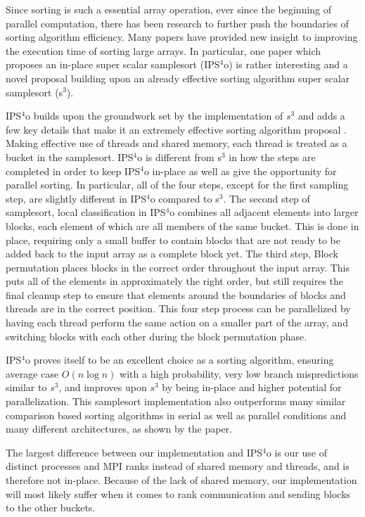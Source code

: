 \documentclass[10pt,letterpaper]{article}
\begin{document}
\begin{multicols}{2}
Since sorting is such a essential array operation, ever since the beginning of parallel computation, there has been research to further push the boundaries of sorting algorithm efficiency. Many papers have provided new insight to improving the execution time of sorting large arrays. In particular, one paper which proposes an in-place super scalar samplesort (IPS$^4$o) is rather interesting and a novel proposal building upon an already effective sorting algorithm super scalar samplesort (s$^3$).

IPS$^4$o builds upon the groundwork set by the implementation of $s^3$ \cite{10.1007/978-3-540-30140-0_69} and adds a few key details that make it an extremely effective sorting algorithm proposal \cite{DBLP:journals/corr/AxtmannWF017}. Making effective use of threads and shared memory, each thread is treated as a bucket in the samplesort. IPS$^4$o is different from s$^3$ in how the steps are completed in order to keep IPS$^4$o in-place as well as give the opportunity for parallel sorting. In particular, all of the four steps, except for the first sampling step, are slightly different in IPS$^4$o compared to s$^3$. The second step of samplesort, local classification in IPS$^4$o combines all adjacent elements into larger blocks, each element of which are all members of the same bucket. This is done in place, requiring only a small buffer to contain blocks that are not ready to be added back to the input array as a complete block yet. The third step, Block permutation places blocks in the correct order throughout the input array. This puts all of the elements in approximately the right order, but still requires the final cleanup step to ensure that elements around the boundaries of blocks and threads are in the correct position. This four step process can be parallelized by having each thread perform the same action on a smaller part of the array, and switching blocks with each other during the block permutation phase.

IPS$^4$o proves itself to be an excellent choice as a sorting algorithm, ensuring average case $O(n \log n)$ with a high probability, very low branch mispredictions similar to $s^3$, and improves upon $s^3$ by being in-place and higher potential for parallelization. This samplesort implementation also outperforms many similar comparison based sorting algorithms in serial as well as parallel conditions and many different architectures, as shown by the paper.

The largest difference between our implementation and IPS$^4$o is our use of distinct processes and MPI ranks instead of shared memory and threads, and is therefore not in-place. Because of the lack of shared memory, our implementation will most likely suffer when it comes to rank communication and sending blocks to the other buckets.


\end{multicols}
\end{document}

